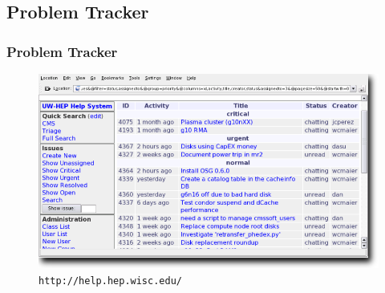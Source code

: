 \documentclass{beamer}
\begin{document}
\subsection{Problem Tracker}
\begin{frame}
\frametitle{Problem Tracker}
\begin{figure}
    \includegraphics*{Graphics/problem-tracker.png}
    \caption{{\tt http://help.hep.wisc.edu/}}
\end{figure}
\end{frame}
\end{document}
